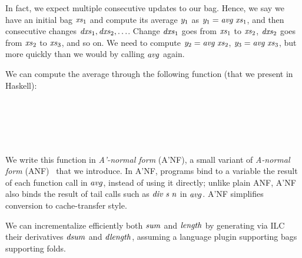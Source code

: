 
In fact, we expect multiple consecutive updates to our bag. Hence, we say we have
an initial bag \ensuremath{\Varid{xs}_{1}} and compute its average \ensuremath{\Varid{y}_{1}} as \ensuremath{\Varid{y}_{1}\mathrel{=}\Varid{avg}\;\Varid{xs}_{1}}, and then consecutive changes
\ensuremath{\Varid{dxs}_{1},\Varid{dxs}_{2},\ldots}. Change \ensuremath{\Varid{dxs}_{1}} goes from \ensuremath{\Varid{xs}_{1}} to \ensuremath{\Varid{xs}_{2}},
\ensuremath{\Varid{dxs}_{2}} goes from \ensuremath{\Varid{xs}_{2}} to \ensuremath{\Varid{xs}_{3}}, and so on. We need to compute \ensuremath{\Varid{y}_{2}\mathrel{=}\Varid{avg}\;\Varid{xs}_{2}},
\ensuremath{\Varid{y}_{3}\mathrel{=}\Varid{avg}\;\Varid{xs}_{3}}, but more quickly than we would by calling \ensuremath{\Varid{avg}} again.

We can compute the average through the following function (that we present in Haskell):
\begin{hscode}\SaveRestoreHook
{}%
%
%
%
%
\>[B]{}\;\mathrel{=}{}\<[E]%
\\
\>[B]{}\<[3]%
\>[3]{}\;{}\<[8]%
\>[8]{}\mathrel{=}{}\<[13]%
\>[13]{}\;\<[E]%
\\
\>[8]{}\mathrel{=}{}\<[13]%
\>[13]{}\;\<[E]%
\\
\>[8]{}\mathrel{=}{}\<[13]%
\>[13]{}\;\;\<[E]%
\\
\>[B]{}\<[3]%
\>[3]{}\;{}\<[8]%
\>[8]{}\<[E]%
\ColumnHook
\end{hscode}\resethooks
We write this function in \emph{A'-normal form} (A'NF), a small variant of
\emph{A-normal form} (ANF)~\cite{sabry1993reasoning} that we introduce. In
A'NF, programs bind to a variable the result of each function call in \ensuremath{\Varid{avg}},
instead of using it directly; unlike plain ANF, A'NF also binds the result of
tail calls such as \ensuremath{\Varid{div}\;\Varid{s}\;\Varid{n}} in \ensuremath{\Varid{avg}}. A'NF simplifies conversion to
cache-transfer style.

We can incrementalize efficiently both \ensuremath{\Varid{sum}} and \ensuremath{\Varid{length}} by generating via
ILC their derivatives \ensuremath{\Varid{dsum}} and \ensuremath{\Varid{dlength}}, assuming a language plugin
supporting bags supporting folds.

